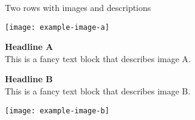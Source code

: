\begin{frame}[c]{Two rows with images and descriptions}
%
\begin{minipage}{0.5\textwidth}
	\texttt{[image: example-image-a]}
\end{minipage}\hfill
\begin{minipage}{0.45\textwidth}
	\centering
	\textbf{Headline A}\\
	
	This is a fancy text block that describes image A.
\end{minipage}
\vfill
\begin{minipage}{0.45\textwidth}
	\centering
	\textbf{Headline B}\\
	
	This is a fancy text block that describes image B.	
\end{minipage}\hfill
\begin{minipage}{0.5\textwidth}
	\texttt{[image: example-image-b]}
\end{minipage}
%
\end{frame}